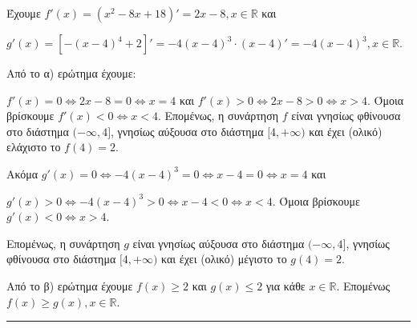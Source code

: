 \begin{alist}
\item Έχουμε $f'(x)=\left(x^2-8x+18\right)'=2x-8, x \in \mathbb{R}$ και

$g'(x)=\left[-(x-4)^4+2\right]'=-4(x-4)^3 \cdot (x-4)'=-4(x-4)^3, x \in \mathbb{R}$.

\item Από το α) ερώτημα έχουμε:

$f'(x)=0 \Leftrightarrow 2x-8=0 \Leftrightarrow x=4$ \quad και \quad $f'(x)>0 \Leftrightarrow 2x-8>0 \Leftrightarrow x>4$. Όμοια βρίσκουμε $f'(x)<0 \Leftrightarrow x<4$. Επομένως, η συνάρτηση $f$ είναι γνησίως φθίνουσα στο διάστημα $(-\infty, 4]$, γνησίως αύξουσα στο διάστημα $[4, +\infty)$ και έχει (ολικό) ελάχιστο το $f(4)=2$.

Ακόμα $g'(x)=0 \Leftrightarrow -4(x-4)^3=0 \Leftrightarrow x-4=0 \Leftrightarrow x=4$ και

$g'(x)>0 \Leftrightarrow -4(x-4)^3>0 \Leftrightarrow x-4<0 \Leftrightarrow x<4$. Όμοια βρίσκουμε $g'(x)<0 \Leftrightarrow x>4$.

Επομένως, η συνάρτηση $g$ είναι γνησίως αύξουσα στο διάστημα $(-\infty, 4]$, γνησίως φθίνουσα στο διάστημα $[4, +\infty)$ και έχει (ολικό) μέγιστο το $g(4)=2$.

\item Από το β) ερώτημα έχουμε $f(x) \ge 2$ και $g(x) \le 2$ για κάθε $x \in \mathbb{R}$. Επομένως $f(x) \ge g(x), x \in \mathbb{R}$.
\end{alist}
\vspace{6mm}
\noindent\rule{\textwidth}{0.4pt}
\vspace{6mm}

